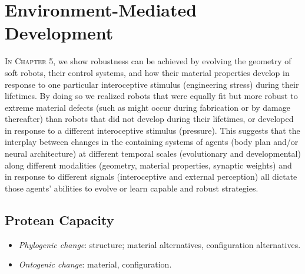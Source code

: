 



\section{Environment-Mediated Development}

\textsc{In Chapter 5,}
we show robustness can be achieved by evolving the 
geometry of soft robots, their control systems, and how
their material properties develop in response to one particular interoceptive stimulus (engineering stress) during their lifetimes.
By doing so we realized robots that were equally fit but more robust to  extreme material defects (such as might occur during fabrication or by damage thereafter) than robots that did not develop during their lifetimes, or developed in response to a different interoceptive stimulus (pressure).
This suggests that the interplay between changes
in the containing systems
of agents (body plan and/or neural architecture)
at different temporal scales (evolutionary
and developmental) along different modalities
(geometry, material properties, synaptic weights)
and in response to different signals (interoceptive
and external perception) all
dictate those agents' abilities to evolve or 
learn capable and robust strategies.


\subsection{Protean Capacity}

\begin{itemize}
    \item \textit{Phylogenic change}: structure; material alternatives, configuration alternatives.
    \item \textit{Ontogenic change}: material, configuration.
\end{itemize}


